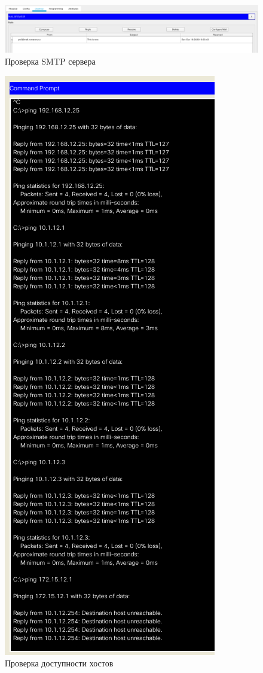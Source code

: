 \documentclass[12pt]{report}
\begin{document}
\begin{figure}[H]
	\begin{center}
		\includegraphics[scale=0.45]{img/16.png}
	\end{center}
	\caption{Проверка SMTP сервера}
	\label{fig:16}
\end{figure}

\begin{figure}[H]
	\begin{center}
		\includegraphics[scale=0.6]{img/17.png}
	\end{center}
	\caption{Проверка доступности хостов}
	\label{fig:17}
\end{figure}
\end{document}
